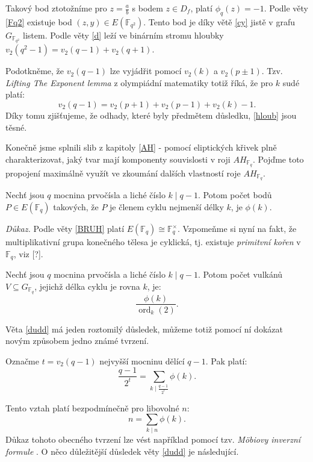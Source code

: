\documentclass[12pt]{report}
\DeclareMathOperator{\ord}{ord}
\begin{document}
Takový bod ztotožníme pro $z = \frac{a}{b}$ s bodem $z \in D_f$, platí $\phi_q(z) = -1$. Podle věty \ref{Fq2} existuje bod $(z,y) \in E(\mathbb{F}_{q^2})$. Tento bod je díky větě \ref{cy} jistě v grafu $G_{\mathbb{F}_{q^2}}$ listem. Podle věty \ref{d} leží ve binárním stromu hloubky $v_2(q^2-1) = v_2(q-1)+v_2(q+1)$.



\begin{poznamka}
Podotkněme, že $v_2 (q-1)$ lze vyjádřit pomocí $v_2(k)$ a $v_2(p \pm 1)$. Tzv.  \textit{Lifting The Exponent lemma} z olympiádní matematiky totiž říká, že pro $k$ sudé platí: $$v_2(q-1) = v_2(p+1)+v_2(p-1)+v_2(k)-1.$$ Díky tomu zjišťujeme, že odhady, které byly předmětem důsledku, \ref{hloub} jsou těsné.
\end{poznamka}


Konečně jsme splnili slib z kapitoly \ref{AH} - pomocí eliptických křivek plně charakterizovat, jaký tvar mají komponenty souvislosti v roji $AH_{\mathbb{F}_q}$. Pojďme toto propojení maximálně využít ve zkoumání dalších vlastností roje $AH_{\mathbb{F}_q}$.

\begin{lemma}\label{phi}
Nechť jsou $q$ mocnina prvočísla a liché číslo $k \mid q-1$. Potom počet bodů $P \in E(\mathbb{F}_q)$ takových, že $P$ je členem cyklu nejmenší délky $k$, je $\phi(k)$. 
\end{lemma}
\noindent \textit{Důkaz.} Podle věty \ref{BRUH} platí $E(\mathbb{F}_q) \cong \mathbb{F}_q ^{\times}$. Vzpomeňme si nyní na fakt, že multiplikativní grupa konečného tělesa je cyklická, tj. existuje \textit{primitvní kořen} v $\mathbb{F}_q$, viz [?].  

\begin{veta}\label{dudd}
Nechť jsou $q$ mocnina prvočísla a liché číslo $k \mid q-1$. Potom počet vulkánů $V \subseteq G_{\mathbb{F}_q}$, jejichž délka cyklu je rovna $k$, je:
$$\frac{\phi(k)}{\ord_k (2)}.$$
\end{veta}

Věta \ref{dudd} má jeden roztomilý důsledek, můžeme totiž pomocí ní dokázat novým způsobem jedno známé tvrzení.

\begin{dusledek}
Označme $t = v_2(q-1)$ nejvyšší mocninu dělící $q-1$. Pak platí:
$$\frac{q-1}{2^t} = \sum_{k \mid \frac{q-1}{2^t}} \phi(k).$$
\end{dusledek}

Tento vztah platí bezpodmínečně pro libovolné $n$:
$$n = \sum_{k \mid n} \phi(k).$$
Důkaz tohoto obecného tvrzení lze vést například pomocí tzv. \textit{M\"{o}biovy inverzní formule} \cite[Ch.3 Thm 2.]{Ireland}. O něco důležitější důsledek věty \ref{dudd} je následující.
\end{document}
